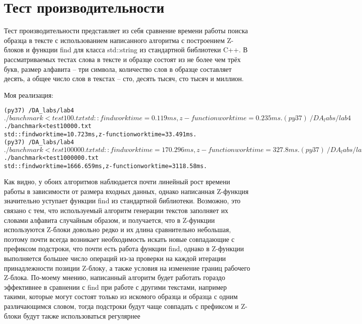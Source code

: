 \section{Тест производительности}

Тест производительности представляет из себя сравнение времени работы поиска образца в тексте с использованием написанного алгоритма с построением Z-блоков и
функции find для класса std::string из стандартной библиотеки C++. В рассматриваемых тестах слова в тексте и образце состоят из не более чем трёх букв, размер
алфавита – три символа, количество слов в образце составляет десять, а общее число
слов в текстах – сто, десять тысяч, сто тысяч и миллион.

Моя реализация:
\begin{alltt}
(py37) ~ /DA_labs/lab4$ ./banchmark <test100.txt
std::find work time = 0.119ms,z-function work time = 0.235ms.
(py37) ~ /DA_labs/lab4$ ./banchmark <test10000.txt
std::find work time = 10.723ms,z-function work time = 33.491ms.
(py37) ~ /DA_labs/lab4$ ./banchmark <test100000.txt
std::find work time = 170.296ms,z-function work time = 327.8ms.
(py37) ~ /DA_labs/lab4$ ./banchmark <test1000000.txt
std::find work time = 1666.659ms,z-function work time = 3118.58ms.
\end{alltt}

Как видно, у обоих алгоритмов наблюдается почти линейный рост времени работы в зависимости от размера входных данных, однако написанная Z-функция значительно
уступает функции find из стандартной библиотеки. Возможно, это связано с тем, что
используемый алгоритм генерации текстов заполняет их словами алфавита случайным образом, и получается, что в Z-функции используются Z-блоки довольно редко
и их длина сравнительно небольшая, поэтому почти всегда возникает необходимость
искать новые совпадающие с префиксом подстроки, что почти есть работа функции
find, однако в Z-функции выполняется большее число операций из-за проверки на
каждой итерации принадлежности позиции Z-блоку, а также условия на изменение
границ рабочего Z-блока.
По-моему мнению, написанный алгоритм будет работать гораздо эффективнее в
сравнении с find при работе с другими текстами, например такими, которые могут
состоят только из искомого образца и образца с одним различающимся словом, тогда
подстроки будут чаще совпадать с префиксом и Z-блоки будут также использоваться
регулярнее
\pagebreak


